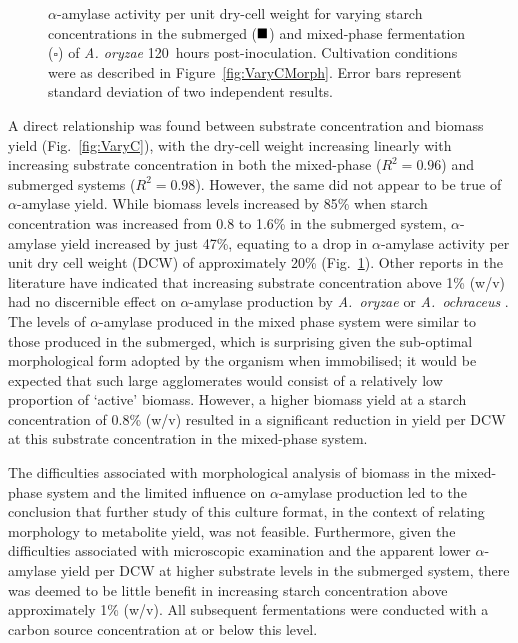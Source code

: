\begin{figure}[tb]
	\centering
  \caption{$\alpha$-amylase activity per unit dry-cell weight for varying starch concentrations in the submerged ($\blacksquare$) and mixed-phase fermentation ($\square$) of \emph{A. oryzae} 120~hours post-inoculation. Cultivation conditions were as described in Figure~\ref{fig:VaryCMorph}. Error bars represent standard deviation of two independent results.}
  \label{fig:VaryCAAperDCW}
\end{figure}

A direct relationship was found between substrate concentration and biomass yield (Fig.~\ref{fig:VaryC}), with the dry-cell weight increasing linearly with increasing substrate concentration in both the mixed-phase ($R^2=0.96$) and submerged systems ($R^2=0.98$). However, the same did not appear to be true of $\alpha$-amylase yield. While biomass levels increased by 85\% when starch concentration was increased from 0.8 to 1.6\% in the submerged system, $\alpha$-amylase yield increased by just 47\%, equating to a drop in $\alpha$-amylase activity per unit dry cell weight (DCW) of approximately 20\% (Fig.~\ref{fig:VaryCAAperDCW}). Other reports in the literature have indicated that increasing substrate concentration above 1\% (w/v) had no discernible effect on $\alpha$-amylase production by \emph{A.~oryzae} \cite{ramachandran2004} or \emph{A.~ochraceus} \cite{nahas2002}. The levels of $\alpha$-amylase produced in the mixed phase system were similar to those produced in the submerged, which is surprising given the sub-optimal morphological form adopted by the organism when immobilised; it would be expected that such large agglomerates would consist of a relatively low proportion of \lq active' biomass. However, a higher biomass yield at a starch concentration of 0.8\% (w/v) resulted in a significant reduction in yield per DCW at this substrate concentration in the mixed-phase system.

The difficulties associated with morphological analysis of biomass in the mixed-phase system and the limited influence on $\alpha$-amylase production led to the conclusion that further study of this culture format, in the context of relating morphology to metabolite yield, was not feasible. Furthermore, given the difficulties associated with microscopic examination and the apparent lower $\alpha$-amylase yield per DCW at higher substrate levels in the submerged system, there was deemed to be little benefit in increasing starch concentration above approximately 1\% (w/v). All subsequent fermentations were conducted with a carbon source concentration at or below this level.

